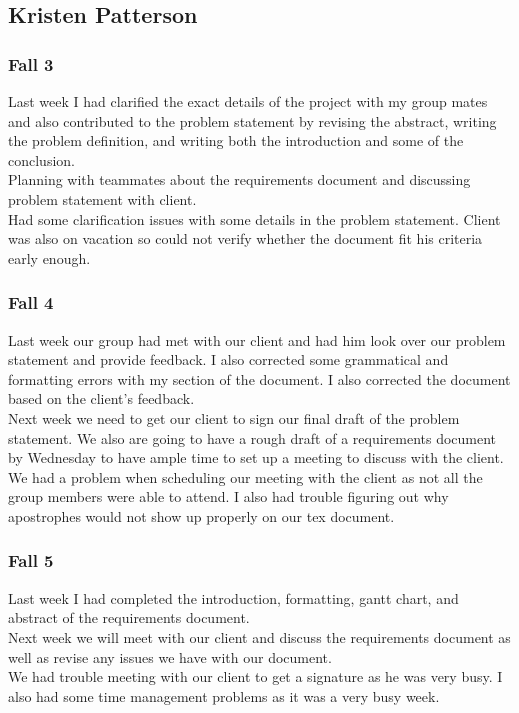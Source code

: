 \subsection{Kristen Patterson}
\subsubsection{Fall 3}
Last week I had clarified the exact details of the project with my group mates and also contributed to the problem statement by revising the abstract, writing the problem definition, and writing both the introduction and some of the conclusion.\\ Planning with teammates about the requirements document and discussing problem statement with client.\\ Had some clarification issues with some details in the problem statement. Client was also on vacation so could not verify whether the document fit his criteria early enough.\\

\subsubsection{Fall 4} 
Last week our group had met with our client and had him look over our problem statement and provide feedback. I also corrected some grammatical and formatting errors with my section of the document. I also corrected the document based on the client's feedback.\\ Next week we need to get our client to sign our final draft of the problem statement. We also are going to have a rough draft of a requirements document by Wednesday to have ample time to set up a meeting to discuss with the client.\\ We had a problem when scheduling our meeting with the client as not all the group members were able to attend. I also had trouble figuring out why apostrophes would not show up properly on our tex document.\\

\subsubsection{Fall 5}
Last week I had completed the introduction, formatting, gantt chart, and abstract of the requirements document.\\ Next week we will meet with our client and discuss the requirements document as well as revise any issues we have with our document.\\ We had trouble meeting with our client to get a signature as he was very busy. I also had some time management problems as it was a very busy week.\\

